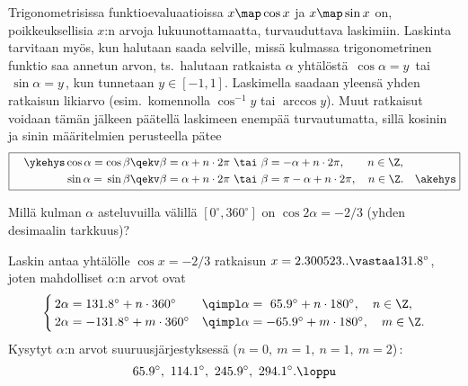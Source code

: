 Trigonometrisissa funktioevaluaatioissa $x\map\cos x$ ja $x\map\sin x$ on, poikkeuksellisia 
$x$:n arvoja lukuunottamaatta, turvauduttava laskimiin. Laskinta tarvitaan myös, kun halutaan
saada selville, missä kulmassa trigonometrinen funktio saa annetun arvon, ts.\ halutaan 
ratkaista $\alpha$ yhtälöstä $\,\cos\alpha=y\,$ tai $\,\sin\alpha=y\,$, kun tunnetaan
$y\in[-1,1]$. Laskimella saadaan yleensä yhden ratkaisun likiarvo (esim.\ komennolla 
$\cos^{-1} y$ tai $\arccos y$). Muut ratkaisut voidaan tämän jälkeen päätellä laskimeen 
enempää turvautumatta, sillä kosinin ja sinin määritelmien perusteella pätee
\[ \boxed{ \begin{aligned} \quad\ykehys
\cos\alpha=\cos\beta &\qekv \beta=\alpha + n \cdot 2\pi\ 
                            \tai\ \beta=-\alpha + n \cdot 2\pi, \qquad n\in\Z, \\
\sin\alpha=\,\sin\beta &\qekv \beta=\alpha + n \cdot 2\pi\ 
                              \tai\ \beta=\pi-\alpha + n \cdot 2\pi, \quad n\in\Z. \quad\akehys
\end{aligned} } \]
\begin{Exa} Millä kulman $\alpha$ asteluvuilla välillä $[0^{\circ},360^{\circ}]$ on
$\cos 2\alpha=-2/3$ (yhden desimaalin tarkkuus)?
\end{Exa}
\ratk Laskin antaa yhtälölle $\cos x=-2/3$ ratkaisun $x=2.300523.. \vastaa 131.8^{\circ}$,
joten mahdolliset $\alpha$:n arvot ovat
\[ \begin{cases}
\,2\alpha = 131.8^{\circ} + n \cdot 360^{\circ} 
               &\qimpl \alpha = \ 65.9^{\circ} + n \cdot 180^{\circ}, \quad n\in\Z, \\
\,2\alpha = -131.8^{\circ} + m \cdot 360^{\circ} 
               &\qimpl \alpha =  -65.9^{\circ} + m \cdot 180^{\circ}, \quad m\in\Z.
\end{cases} \]
Kysytyt $\alpha$:n arvot suuruusjärjestyksessä ($n=0,\ m=1,\ n=1,\ m=2$)\,:
\[
65.9^{\circ},\ 114.1^{\circ},\ 245.9^{\circ},\ 294.1^{\circ}. \loppu
\]

